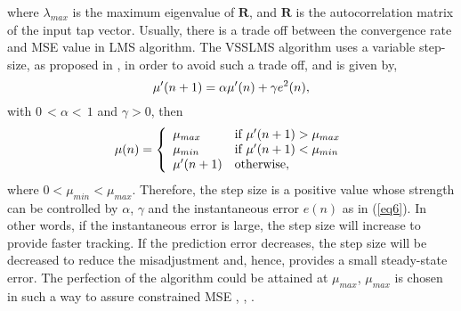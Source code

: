 \noindent where $\lambda_{max}$ is the maximum eigenvalue of $\textbf{R}$, and $\textbf{R}$ is the autocorrelation matrix of the input tap vector. Usually,
there is a trade off between the convergence rate and MSE value in LMS algorithm. The VSSLMS algorithm uses a variable step-size, as proposed
in \cite{Harris}, in order to avoid such a trade off, and is given by,
\vspace{-0.1cm}
\begin{equation}
\mu^{\prime}(n+1)=\alpha\mu^{\prime}(n)+\gamma e^2(n),\label{eq6}\vspace{-0.1cm}
\end{equation}
\noindent with $0\hspace{2pt}<\alpha<\hspace{2pt}1$ and $\gamma>0$, then
\vspace{-0.1cm}
\begin{equation}
 \mu(n)=\left\{
    \begin{array}{ll}
      \mu_{max} & \mbox{if $\mu^{\prime}(n+1)> \mu_{max}$} \\
        \mu_{min} & \mbox{if $\mu^{\prime}(n+1)< \mu_{min}$} \\
      \mu^{\prime}(n+1) & \mbox{otherwise},    \end{array} \right.\label{eq7}\vspace{-0.1cm}
\end{equation}
\noindent where $0<\mu_{min}<\mu_{max}$. Therefore, the step size is a positive value whose strength can be controlled by $\alpha$, $\gamma$ and the
instantaneous error $e(n)$ as in (\ref{eq6}). In other words, if the instantaneous error is large, the step size will increase to  provide  faster
tracking. If the prediction error decreases, the step size will be decreased to reduce the misadjustment and, hence, provides a small steady-state error.
The perfection of the algorithm could be attained at $\mu_{max}$, $\mu_{max}$ is chosen in such a way to assure constrained MSE \cite{Kwong}, \cite{Shukri}, \cite{Mader}.

\vspace{-0.3cm}

